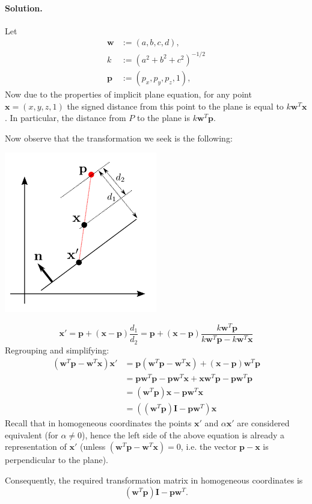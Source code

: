 \documentclass{article}
\newcommand{\bw}{\mathbf{w}}
\newcommand{\bx}{\mathbf{x}}
\newcommand{\bp}{\mathbf{p}}
\newcommand{\bI}{\mathbf{I}}
\begin{document}
\begin{enumerate}
\paragraph{Solution.}
Let
\begin{align*}
\bw &:= (a,b,c,d),\\
k &:= (a^2 + b^2 + c^2)^{-1/2}\\
\bp &:= (p_x, p_y, p_z, 1),
\end{align*}
Now due to the properties of implicit plane equation, for any point $\bx = (x, y, z, 1)$ the signed distance from this point to the plane is equal to $k\bw^T\bx$. In particular, the distance from $P$ to the plane is $k\bw^T\bp$.

Now observe that the transformation we seek is the following:
\begin{center}
\includegraphics[width=0.5\textwidth]{projection3.png}
\end{center}
$$
\bx' = \bp + (\bx - \bp)\frac{d_1}{d_2} = \bp + (\bx - \bp)\frac{k\bw^T\bp}{k\bw^T\bp - k\bw^T\bx}
$$
Regrouping and simplifying:
\begin{align*}
(\bw^T\bp - \bw^T\bx)\bx' &= \bp(\bw^T\bp - \bw^T\bx) + (\bx - \bp)\bw^T\bp \\
&= \bp\bw^T\bp - \bp\bw^T\bx + \bx\bw^T\bp - \bp\bw^T\bp \\
&= (\bw^T\bp)\bx - \bp\bw^T\bx \\
&= ((\bw^T\bp)\bI - \bp\bw^T)\bx
\end{align*}
Recall that in homogeneous coordinates the points $\bx'$ and $\alpha\bx'$ are considered equivalent (for $\alpha \neq 0$), hence the left side of the above equation is already a representation of $\bx'$ (unless $(\bw^T\bp - \bw^T\bx) = 0$, i.e. the vector $\bp-\bx$ is perpendicular to the plane).

Consequently, the required transformation matrix in homogeneous coordinates is
$$(\bw^T\bp)\bI - \bp\bw^T.$$


\end{enumerate}
\end{document}
